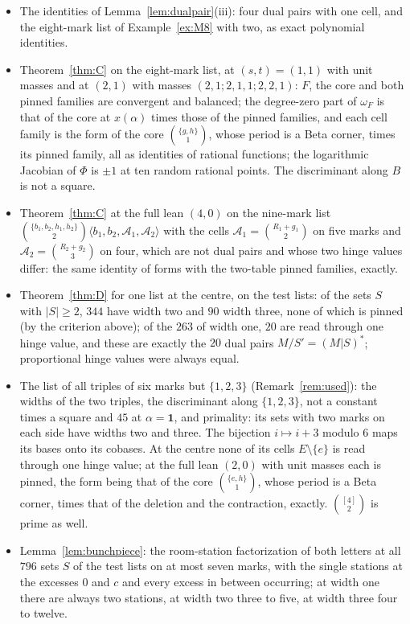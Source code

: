 \documentclass[11pt]{article}
\theoremstyle{plain}
\theoremstyle{definition}
\theoremstyle{remark}
\begin{document}
\begin{itemize}
\item The identities of Lemma~\ref{lem:dualpair}(iii): four dual pairs with one cell, and the eight-mark list of Example~\ref{ex:M8} with two, as exact polynomial identities.
\item Theorem~\ref{thm:C} on the eight-mark list, at $(s,t)=(1,1)$ with unit masses and at $(2,1)$ with masses $(2,1;2,1,1;2,2,1)$: $F$, the core and both pinned families are convergent and balanced; the degree-zero part of $\omega_F$ is that of the core at $x(\alpha)$ times those of the pinned families, and each cell family is the form of the core $\binom{\{g,h\}}1$, whose period is a Beta corner, times its pinned family, all as identities of rational functions; the logarithmic Jacobian of $\Phi$ is $\pm1$ at ten random rational points. The discriminant along $B$ is not a square.
\item Theorem~\ref{thm:C} at the full lean $(4,0)$ on the nine-mark list $\binom{\{b_1,b_2,h_1,h_2\}}2\langle b_1,b_2,\mathcal A_1,\mathcal A_2\rangle$ with the cells $\mathcal A_1=\binom{R_1+g_1}2$ on five marks and $\mathcal A_2=\binom{R_2+g_2}3$ on four, which are not dual pairs and whose two hinge values differ: the same identity of forms with the two-table pinned families, exactly.
\item Theorem~\ref{thm:D} for one list at the centre, on the test lists: of the sets $S$ with $|S|\ge2$, $344$ have width two and $90$ width three, none of which is pinned (by the criterion above); of the $263$ of width one, $20$ are read through one hinge value, and these are exactly the $20$ dual pairs $M/S'=(M|S)^\ast$; proportional hinge values were always equal.
\item The list of all triples of six marks but $\{1,2,3\}$ (Remark~\ref{rem:used}): the widths of the two triples, the discriminant along $\{1,2,3\}$, not a constant times a square and $45$ at $\alpha=\mathbf 1$, and primality: its sets with two marks on each side have widths two and three. The bijection $i\mapsto i+3$ modulo $6$ maps its bases onto its cobases. At the centre none of its cells $E\setminus\{e\}$ is read through one hinge value; at the full lean $(2,0)$ with unit masses each is pinned, the form being that of the core $\binom{\{e,h\}}1$, whose period is a Beta corner, times that of the deletion and the contraction, exactly. $\binom{[4]}2$ is prime as well.
\item Lemma~\ref{lem:bunchpiece}: the room-station factorization of both letters at all $796$ sets $S$ of the test lists on at most seven marks, with the single stations at the excesses $0$ and $c$ and every excess in between occurring; at width one there are always two stations, at width two three to five, at width three four to twelve.

\end{itemize}
\end{document}
